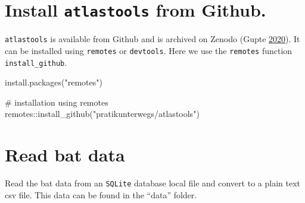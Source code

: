 \documentclass[]{scrreprt}
\newenvironment{Shaded}{}{}
\newcommand{\CharTok}[1]{\textcolor[rgb]{0.00,0.50,0.50}{#1}}
\newcommand{\CommentTok}[1]{\textcolor[rgb]{0.00,0.50,0.00}{#1}}
\newcommand{\DataTypeTok}[1]{#1}
\newcommand{\KeywordTok}[1]{\textcolor[rgb]{0.00,0.00,1.00}{#1}}
\newcommand{\NormalTok}[1]{#1}
\newcommand{\OperatorTok}[1]{#1}
\newcommand{\StringTok}[1]{\textcolor[rgb]{0.00,0.50,0.50}{#1}}
\begin{document}
\hypertarget{install-atlastools-from-github.}{%
\section{\texorpdfstring{Install \texttt{atlastools} from Github.}{Install atlastools from Github.}}\label{install-atlastools-from-github.}}

\texttt{atlastools} is available from Github and is archived on Zenodo (Gupte \protect\hyperlink{ref-gupte2020a}{2020}).
It can be installed using \texttt{remotes} or \texttt{devtools}. Here we use the \texttt{remotes} function \texttt{install\_github}.

\begin{Shaded}
\begin{Highlighting}[]
\KeywordTok{install.packages}\NormalTok{(}\StringTok{"remotes"}\NormalTok{)}

\CommentTok{# installation using remotes}
\NormalTok{remotes}\OperatorTok{::}\KeywordTok{install_github}\NormalTok{(}\StringTok{"pratikunterwegs/atlastools"}\NormalTok{)}
\end{Highlighting}
\end{Shaded}

\hypertarget{read-bat-data}{%
\section{Read bat data}\label{read-bat-data}}

Read the bat data from an \texttt{SQLite} database local file and convert to a plain text csv file.
This data can be found in the ``data'' folder.

\begin{Shaded}
\end{Shaded}
\end{document}
